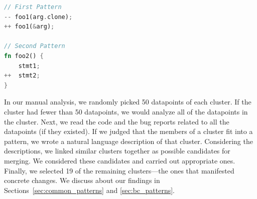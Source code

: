 \begin{lstlisting}[language=Rust, style=colouredRust]
// First Pattern
-- foo1(arg.clone);
++ foo1(&arg);

// Second Pattern
fn foo2() {
    stmt1;
++  stmt2;
}

\end{lstlisting}


In our manual analysis, we randomly picked 50 datapoints of each cluster. If the cluster had fewer than 50 datapoints, we would analyze all of the datapoints in the cluster. Next, we read the code and the bug reports related to all the datapoints (if they existed). If we judged that the members of a cluster fit into a pattern, we wrote a natural language description of that cluster. Considering the descriptions, we linked similar clusters together as possible candidates for merging. We considered these candidates and carried out appropriate ones. Finally, we selected 19 of the remaining clusters---the ones that manifested concrete changes. We discuss about our findings in Sections~\ref{sec:common_patterns} and \ref{sec:bc_patterns}.
